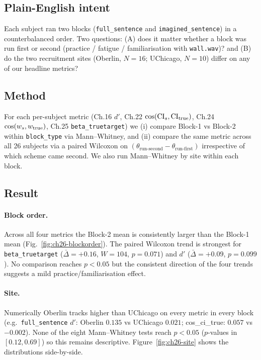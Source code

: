 \documentclass[11pt]{article}
\begin{document}
\subsection{Plain-English intent}

Each subject ran two blocks (\texttt{full\_sentence} and
\texttt{imagined\_sentence}) in a counterbalanced order. Two questions:
(A) does it matter whether a block was run first or second
(practice / fatigue / familiarisation with \texttt{wall.wav})? and
(B) do the two recruitment sites (Oberlin, $N=16$; UChicago, $N=10$)
differ on any of our headline metrics?

\subsection{Method}

For each per-subject metric (Ch.16 $d'$, Ch.22 $\cos(\mathrm{CI}_s,
\mathrm{CI}_{\rm true})$, Ch.24 $\cos(w_s,w_{\rm true})$, Ch.25
\texttt{beta\_truetarget}) we (i) compare Block-1 vs Block-2 within
\texttt{block\_type} via Mann--Whitney, and (ii) compare the same
metric across all 26 subjects via a paired Wilcoxon on
$(\theta_{\text{run-second}}-\theta_{\text{run-first}})$ irrespective
of which scheme came second. We also run Mann--Whitney by site within
each block.

\subsection{Result}

\paragraph{Block order.}
Across all four metrics the Block-2 mean is consistently larger than
the Block-1 mean (Fig.~\ref{fig:ch26-blockorder}). The paired
Wilcoxon trend is strongest for \texttt{beta\_truetarget}
($\bar{\Delta}=+0.16$, $W=104$, $p=0.071$) and
$d'$ ($\bar{\Delta}=+0.09$, $p=0.099$). No comparison reaches
$p<0.05$ but the consistent direction of the four trends suggests a
mild practice/familiarisation effect.

\paragraph{Site.}
Numerically Oberlin tracks higher than UChicago on every metric in
every block (e.g.\ \texttt{full\_sentence} $d'$: Oberlin $0.135$ vs
UChicago $0.021$; cos\_ci\_true: $0.057$ vs $-0.002$). None of the
eight Mann--Whitney tests reach $p<0.05$ ($p$-values in $[0.12,0.69]$)
so this remains descriptive. Figure~\ref{fig:ch26-site} shows the
distributions side-by-side.
\end{document}
